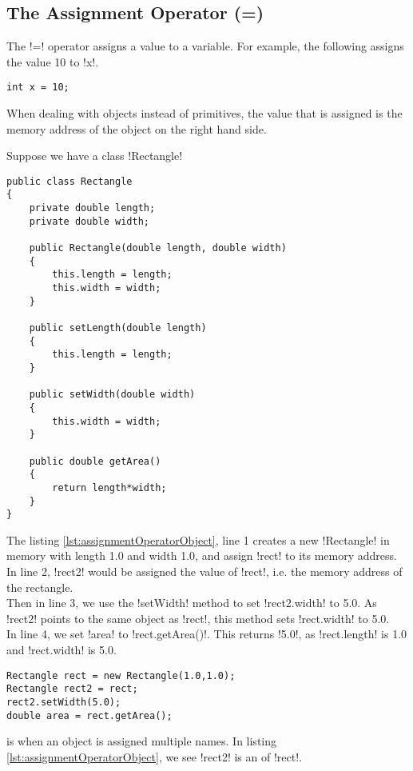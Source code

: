 \documentclass[11pt]{report}
\begin{document}
\subsection{The Assignment Operator (=)}
The \inlineJava!=! operator assigns a value to a variable. For example, the following assigns the value 10 to \inlineJava!x!.
\vspace{-15pt}
\begin{lstlisting}
int x = 10;
\end{lstlisting}
When dealing with objects instead of primitives, the value that is assigned is the memory address of the object on the right hand side.
\begin{eg} Suppose we have a class \inlineJava!Rectangle!
\begin{lstlisting}[caption=Rectangle, label=lst:Rectangle]
public class Rectangle
{
    private double length;
    private double width;

    public Rectangle(double length, double width)
    {
        this.length = length;
        this.width = width;
    }

    public setLength(double length)
    {
        this.length = length;
    }

    public setWidth(double width)
    {
        this.width = width;
    }
    
    public double getArea()
    {
        return length*width;
    }
}
\end{lstlisting}
\pagebreak
The listing \ref{lst:assignmentOperatorObject}, line 1 creates a new \inlineJava!Rectangle! in memory with length 1.0 and width 1.0, and assign \inlineJava!rect! to its memory address.
\\ In line 2, \inlineJava!rect2! would be assigned the value of \inlineJava!rect!, i.e. the memory address of the rectangle.
\\ Then in line 3, we use the \inlineJava!setWidth! method to set \inlineJava!rect2.width! to 5.0. As \inlineJava!rect2! points to the same object as \inlineJava!rect!, this method sets \inlineJava!rect.width! to 5.0.
\\ In line 4, we set \inlineJava!area! to \inlineJava!rect.getArea()!. This returns \inlineJava!5.0!, as \inlineJava!rect.length! is 1.0 and \inlineJava!rect.width! is 5.0.
\begin{lstlisting}[caption=A sample of code to interact with the Rectangle class, label=lst:assignmentOperatorObject] 
Rectangle rect = new Rectangle(1.0,1.0);
Rectangle rect2 = rect;
rect2.setWidth(5.0);
double area = rect.getArea();
\end{lstlisting}
\end{eg}
\begin{defi}[Aliasing]
 is when an object is assigned multiple names. In listing \ref{lst:assignmentOperatorObject}, we see \inlineJava!rect2! is an  of \inlineJava!rect!.
\end{defi}
\end{document}
